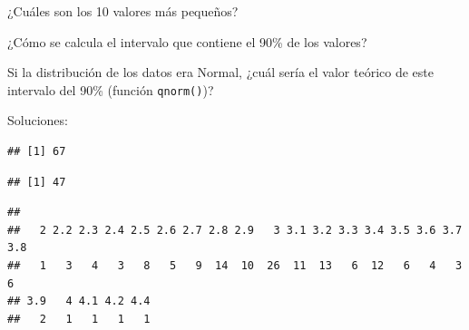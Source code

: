 \documentclass[]{book}
\newenvironment{Shaded}{\begin{snugshade}}{\end{snugshade}}
\newcommand{\KeywordTok}[1]{\textcolor[rgb]{0.13,0.29,0.53}{\textbf{#1}}}
\newcommand{\DecValTok}[1]{\textcolor[rgb]{0.00,0.00,0.81}{#1}}
\newcommand{\FloatTok}[1]{\textcolor[rgb]{0.00,0.00,0.81}{#1}}
\newcommand{\StringTok}[1]{\textcolor[rgb]{0.31,0.60,0.02}{#1}}
\newcommand{\OperatorTok}[1]{\textcolor[rgb]{0.81,0.36,0.00}{\textbf{#1}}}
\newcommand{\NormalTok}[1]{#1}
\begin{document}
¿Cuáles son los 10 valores más pequeños?

¿Cómo se calcula el intervalo que contiene el 90\% de los valores?

Si la distribución de los datos era Normal, ¿cuál sería el valor teórico
de este intervalo del 90\% (función \texttt{qnorm()})?

Soluciones:

\begin{Shaded}
\end{Shaded}

\begin{verbatim}
## [1] 67
\end{verbatim}

\begin{Shaded}
\end{Shaded}

\begin{verbatim}
## [1] 47
\end{verbatim}

\begin{Shaded}
\end{Shaded}

\begin{verbatim}
## 
##   2 2.2 2.3 2.4 2.5 2.6 2.7 2.8 2.9   3 3.1 3.2 3.3 3.4 3.5 3.6 3.7 3.8 
##   1   3   4   3   8   5   9  14  10  26  11  13   6  12   6   4   3   6 
## 3.9   4 4.1 4.2 4.4 
##   2   1   1   1   1
\end{verbatim}

\begin{Shaded}
\end{Shaded}
\end{document}
